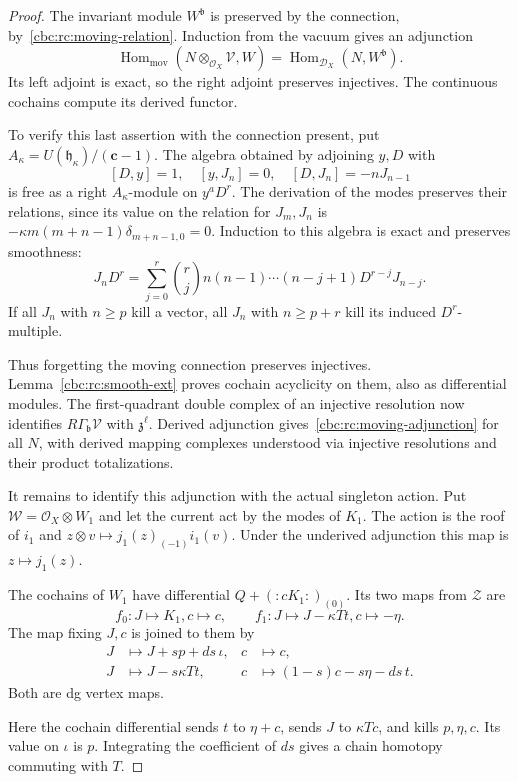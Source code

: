 \begin{proof}
The invariant module $W^{\mathfrak b}$ is preserved by the
connection, by~\eqref{cbc:rc:moving-relation}. Induction from
the vacuum gives an adjunction
\[
 \operatorname{Hom}_{\mathrm{mov}}
 (N\otimes_{\mathcal O_X}\mathcal V,W)
 =\operatorname{Hom}_{\mathcal D_X}(N,W^{\mathfrak b}).
\]
Its left adjoint is exact, so the right adjoint preserves
injectives. The continuous cochains compute its derived
functor.

To verify this last assertion with the connection
present, put $A_\kappa=U(\mathfrak h_\kappa)/(\mathbf c-1)$.
The algebra obtained by adjoining $y,D$ with
\[
 [D,y]=1,\quad [y,J_n]=0,\quad [D,J_n]=-nJ_{n-1}
\]
is free as a right $A_\kappa$-module on $y^aD^r$.
The derivation of the modes preserves their relations, since
its value on the relation for $J_m,J_n$ is
$-\kappa m(m+n-1)\delta_{m+n-1,0}=0$.
Induction to this algebra is exact and preserves smoothness:
\[
 J_nD^r=\sum_{j=0}^r\binom rj
 n(n-1)\cdots(n-j+1)D^{r-j}J_{n-j}.
\]
If all $J_n$ with $n\geq p$ kill a vector, all $J_n$ with
$n\geq p+r$ kill its induced $D^r$-multiple.

Thus forgetting the moving connection preserves injectives.
Lemma~\ref{cbc:rc:smooth-ext} proves cochain acyclicity on
them, also as differential modules. The first-quadrant
double complex of an injective resolution now identifies
$R\Gamma_{\mathfrak b}\mathcal V$ with $\mathfrak z^\ell$.
Derived adjunction gives~\eqref{cbc:rc:moving-adjunction}
for all $N$, with derived mapping complexes understood via
injective resolutions and their product totalizations.

It remains to identify this adjunction with the actual
singleton action. Put $\mathcal W=\mathcal O_X\otimes W_1$
and let the current act by the modes of $K_1$.
The action is the roof of $i_1$ and
$z\otimes v\mapsto j_1(z)_{(-1)}i_1(v)$.
Under the underived adjunction this map is $z\mapsto j_1(z)$.

The cochains of $W_1$ have differential
$Q+(:cK_1:)_{(0)}$. Its two maps from $\mathcal Z$ are
\[
 f_0:J\mapsto K_1, c\mapsto c,
 \qquad f_1:J\mapsto J-\kappa Tt, c\mapsto-\eta.
\]
The map fixing $J,c$ is joined to them by
\begin{align*}
 J&\longmapsto J+sp+ds\,\iota,&c&\longmapsto c,\\
 J&\longmapsto J-s\kappa Tt,&c&\longmapsto(1-s)c-s\eta-ds\,t.
\end{align*}
Both are dg vertex maps.

Here the cochain differential sends
$t$ to $\eta+c$, sends $J$ to $\kappa Tc$, and kills
$p,\eta,c$. Its value on $\iota$ is $p$.
Integrating the coefficient of $ds$ gives a chain homotopy
commuting with $T$.


\end{proof}

